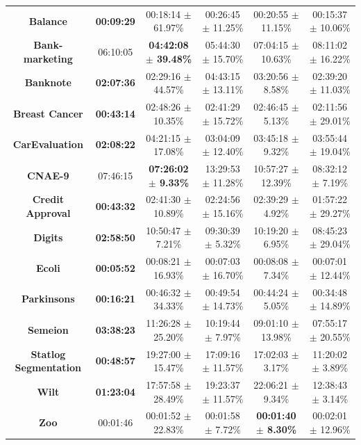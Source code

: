 \documentclass[preprint,12pt]{elsarticle}
\begin{document}
\begin{table}
{\begin{tabular}{cccccc}
\textbf{Balance}                & \textbf{00:09:29} & 00:18:14 $\pm$ 61.97\%          & 00:26:45 $\pm$ 11.25\%     & 00:20:55 $\pm$ 11.15\%         & 00:15:37 $\pm$ 10.06\%          \\
\textbf{Bank-marketing}         & 06:10:05          & \textbf{04:42:08 $\pm$ 39.48\%} & 05:44:30 $\pm$ 15.70\%     & 07:04:15 $\pm$ 10.63\%         & 08:11:02 $\pm$ 16.22\%          \\
\textbf{Banknote}               & \textbf{02:07:36} & 02:29:16 $\pm$ 44.57\%          & 04:43:15 $\pm$ 13.11\%     & 03:20:56 $\pm$ 8.58\%          & 02:39:20 $\pm$ 11.03\%          \\
\textbf{Breast Cancer}          & \textbf{00:43:14} & 02:48:26 $\pm$ 10.35\%          & 02:41:29 $\pm$ 15.72\%     & 02:46:45 $\pm$ 5.13\%          & 02:11:56 $\pm$ 29.01\%          \\
\textbf{CarEvaluation}          & \textbf{02:08:22} & 04:21:15 $\pm$ 17.08\%          & 03:04:09 $\pm$ 12.40\%     & 03:45:18 $\pm$ 9.32\%          & 03:55:44 $\pm$ 19.04\%          \\
\textbf{CNAE-9}                 & 07:46:15          & \textbf{07:26:02 $\pm$ 9.33\%}  & 13:29:53 $\pm$ 11.28\%     & 10:57:27 $\pm$ 12.39\%         & 08:32:12 $\pm$ 7.19\%           \\
\textbf{Credit   Approval}      & \textbf{00:43:32} & 02:41:30 $\pm$ 10.89\%          & 02:24:56 $\pm$ 15.16\%     & 02:39:29 $\pm$ 4.92\%          & 01:57:22 $\pm$ 29.27\%          \\
\textbf{Digits}                 & \textbf{02:58:50} & 10:50:47 $\pm$ 7.21\%           & 09:30:39 $\pm$ 5.32\%      & 10:19:20 $\pm$ 6.95\%          & 08:45:23 $\pm$ 29.04\%          \\
\textbf{Ecoli}                  & \textbf{00:05:52} & 00:08:21 $\pm$ 16.93\%          & 00:07:03 $\pm$ 16.70\%     & 00:08:08 $\pm$ 7.34\%          & 00:07:01 $\pm$ 12.44\%          \\
\textbf{Parkinsons}             & \textbf{00:16:21} & 00:46:32 $\pm$ 34.33\%          & 00:49:54 $\pm$ 14.73\%     & 00:44:24 $\pm$ 5.05\%          & 00:34:48 $\pm$ 14.89\%          \\
\textbf{Semeion}                & \textbf{03:38:23} & 11:26:28 $\pm$ 25.20\%          & 10:19:44 $\pm$ 7.97\%      & 09:01:10 $\pm$ 13.98\%         & 07:55:17 $\pm$ 20.55\%          \\
\textbf{Statlog   Segmentation} & \textbf{00:48:57} & 19:27:00 $\pm$ 15.47\%          & 17:09:16 $\pm$ 11.57\%     & 17:02:03 $\pm$ 3.17\%          & 11:20:02 $\pm$ 3.89\%           \\
\textbf{Wilt}                   & \textbf{01:23:04} & 17:57:58 $\pm$ 28.49\%          & 19:23:37 $\pm$ 11.57\%     & 22:06:21 $\pm$ 9.34\%          & 12:38:43 $\pm$ 3.14\%           \\
\textbf{Zoo}                    & 00:01:46          & 00:01:52 $\pm$ 22.83\%          & 00:01:58 $\pm$ 7.72\%      & \textbf{00:01:40 $\pm$ 8.30\%} & 00:02:01 $\pm$ 12.96\%          \\ \hline
\end{tabular}%
}
\end{table}
\end{document}
